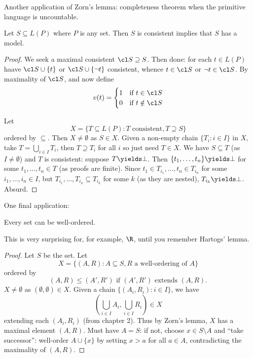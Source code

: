 \documentclass[a4paper]{article}
\begin{document}
Another application of Zorn's lemma: completeness theorem when the primitive language is uncountable.

\begin{theorem}
  Let \(S \subseteq L(P)\) where \(P\) is any set. Then \(S\) is consistent implies that \(S\) has a model.
\end{theorem}

\begin{proof}
  We seek a maximal consistent \(\cl S \supseteq S\). Then done: for each \(t \in L(P)\) haave \(\cl S \cup \{t\}\) or \(\cl S \cup \{\neg t\}\) consistent, whence \(t \in \cl S\) or \(\neg t \in \cl S\). By maximality of \(\cl S\), and now define
  \begin{align*}
    v(t) =
    \begin{cases}
      1 & \text{if } t \in \cl S \\
      0 & \text{if } t \notin \cl S
    \end{cases}
  \end{align*}

  Let
  \[
    X = \{T \subseteq L(P): T \text{ consistent}, T \supseteq S\}
  \]
  ordered by \(\subseteq\). Then \(X \neq \emptyset\) as \(S \in X\). Given a non-empty chain \(\{T_i: i \in I\}\) in \(X\), take \(T = \bigcup_{i \in I} T_i\), then \(T \supseteq T_i\) for all \(i\) so just need \(T \in X\). We have \(S \subseteq T\) (as \(I \neq \emptyset\)) and \(T\) is consistent: suppose \(T \yields \bot\). Then \(\{t_1, \dots, t_n\} \yields \bot\) for some \(t_1, \dots, t_n \in T\) (as proofs are finite). Since \(t_1 \in T_{i_1}, \dots, t_n \in T_{i_n}\) for some \(i_1, \dots, i_n \in I\), but \(T_{i_1}, \dots, T_{i_n} \subseteq T_{i_k}\) for some \(k\) (as they are nested), \(T_{i_k} \yields \bot\). Absurd.
\end{proof}

One final application:

\begin{theorem}
  Every set can be well-ordered.
\end{theorem}

\begin{remark}
  This is very surprising for, for example, \(\R\), until you remember Hartogs' lemma.
\end{remark}

\begin{proof}
  Let \(S\) be the set. Let
  \[
    X = \{(A, R): A \subseteq S, R \text{ a well-ordering of } A\}
  \]
  ordered by
  \[
    (A, R) \leq (A', R') \text{ if } (A', R') \text{ extends } (A, R).
  \]
  \(X \neq \emptyset\) as \((\emptyset, \emptyset) \in X\). Given a chain \(\{(A_i, R_i): i \in I\}\), we have
  \[
    (\bigcup_{i \in I} A_i, \bigcup_{i \in I} R_i) \in X
  \]
  extending each \((A_i, R_i)\) (from chapter 2). Thus by Zorn's lemma, \(X\) has a maximal element \((A, R)\). Must have \(A = S\): if not, choose \(x \in S \setminus A\) and ``take successor'': well-order \(A \cup \{x\}\) by setting \(x > a\) for all \(a \in A\), contradicting the maximality of \((A, R)\).
\end{proof}
\end{document}
